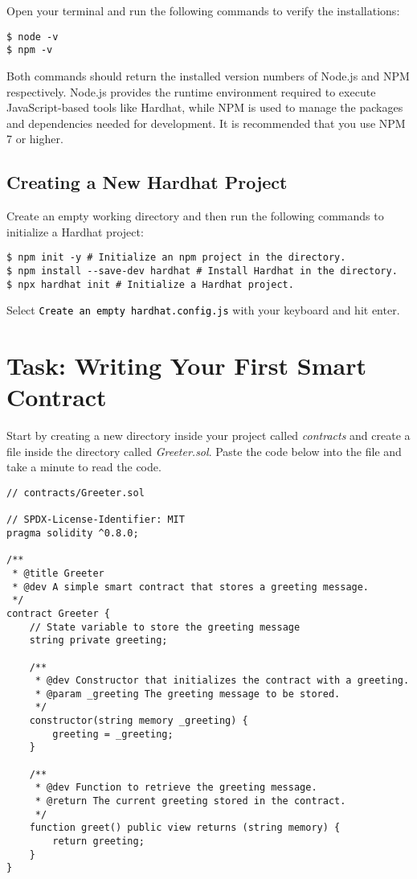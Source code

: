 \documentclass[12pt]{article}
\newcommand{\codegrey}[1]{%
  \texttt{\colorbox{black!4}{\textcolor{black}{#1}}}%
}
\begin{document}
Open your terminal and run the following commands to verify the installations:

\begin{verbatim}
$ node -v
$ npm -v
\end{verbatim}

Both commands should return the installed version numbers of Node.js and NPM respectively. Node.js provides the runtime environment required to execute JavaScript-based tools like Hardhat, while NPM is used to manage the packages and dependencies needed for development. It is recommended that you use NPM 7 or higher.

\subsection{Creating a New Hardhat Project}

Create an empty working directory and then run the following commands to initialize a Hardhat project:

\begin{verbatim}
$ npm init -y # Initialize an npm project in the directory.
$ npm install --save-dev hardhat # Install Hardhat in the directory.
$ npx hardhat init # Initialize a Hardhat project.
\end{verbatim}
Select \codegrey{Create an empty \texttt{hardhat.config.js}} with your keyboard and hit enter.

\section{Task: Writing Your First Smart Contract}

Start by creating a new directory inside your project called \textit{contracts} and create a file inside the directory called \textit{Greeter.sol}. Paste the code below into the file and take a minute to read the code.

\begin{verbatim}
// contracts/Greeter.sol

// SPDX-License-Identifier: MIT
pragma solidity ^0.8.0;

/**
 * @title Greeter
 * @dev A simple smart contract that stores a greeting message.
 */
contract Greeter {
    // State variable to store the greeting message
    string private greeting;

    /**
     * @dev Constructor that initializes the contract with a greeting.
     * @param _greeting The greeting message to be stored.
     */
    constructor(string memory _greeting) {
        greeting = _greeting;
    }

    /**
     * @dev Function to retrieve the greeting message.
     * @return The current greeting stored in the contract.
     */
    function greet() public view returns (string memory) {
        return greeting;
    }
}
\end{verbatim}
\end{document}
